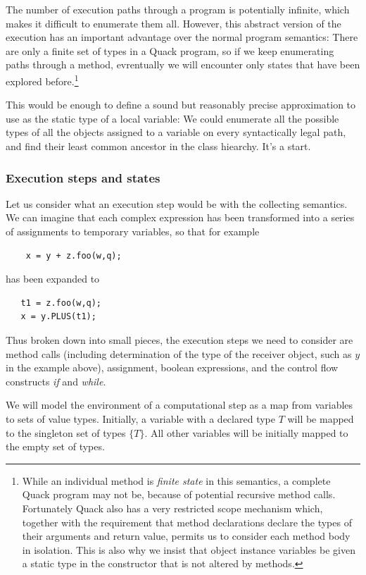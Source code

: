 \documentclass[11pt]{article}
\begin{document}
The number of execution paths through a program is potentially
infinite, which makes it difficult to enumerate them all.  However,
this abstract version of the execution has an important advantage over
the normal program semantics:  There are only a finite set of types in
a Quack program, so if we keep enumerating paths through a method,
evrentually we will encounter only states that have been explored
before.\footnote{While an individual method is \emph{finite state} in
  this semantics, a complete Quack program may not be, because of
  potential recursive method calls.  Fortunately Quack also has a very
  restricted scope mechanism which, together with the requirement that
  method declarations declare the types of their arguments and return
  value, permits us to consider each method body in isolation. This is
  also why we insist that object instance variables be given a static
  type in the constructor that is not altered by methods.}

This would be enough to define a sound but reasonably precise
approximation to use as the static type of a local variable:  We could
enumerate all the possible types of all the objects assigned to a
variable on every syntactically legal path, and find their least
common ancestor in the class hiearchy. It's a start. 

\subsubsection{Execution steps and states}

Let us consider what an execution step would be with the collecting
semantics.  We can imagine that each complex expression has been
transformed into a series of assignments to temporary variables, so
that for example 
\begin{verbatim}
    x = y + z.foo(w,q);
\end{verbatim}

\noindent has been expanded to 

\begin{verbatim}
   t1 = z.foo(w,q);
   x = y.PLUS(t1);
\end{verbatim}

Thus broken down into small pieces, the execution steps we need to
consider are method calls (including determination of the type of the
receiver object, such as $y$ in the example above), assignment,
boolean expressions, and the control flow constructs \emph{if} and
\emph{while}. 

We will model the environment of a computational step as a map from
variables to sets of value types.  Initially, a variable with a
declared type $T$ will be mapped to the singleton set of types 
\(\{ T \}\).  All other variables will be initially mapped to the
empty set of types. 
\end{document}
